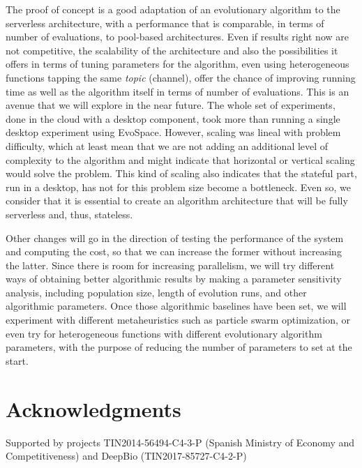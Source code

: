 \documentclass{llncs}
\begin{document}
  The proof of concept is a good adaptation of an evolutionary algorithm
  to the serverless architecture, with a performance that is comparable,
  in terms of number of evaluations, to pool-based architectures. Even
  if results right now are not competitive, the scalability of the
  architecture and also the possibilities it offers in terms of tuning
  parameters for the algorithm, even using heterogeneous functions
  tapping the same {\em topic} (channel), offer the chance of improving
  running time as well as the algorithm itself in terms of number of
  evaluations. This is an avenue that we will explore in the near
  future. The whole set of experiments, done in the cloud with a desktop
  component, took more than running a single desktop experiment using
  EvoSpace. However, scaling was lineal with problem difficulty, which
  at least mean that we are not adding an additional level of complexity
  to the algorithm and might indicate that horizontal or vertical
  scaling would solve the problem. This kind of scaling also indicates
  that the stateful part, run in a desktop, has not for this problem
  size become a bottleneck. Even so, we consider that it is essential to
  create an algorithm architecture that will be fully serverless and,
  thus, stateless.

  Other changes will go in the direction of testing the performance of
  the system and computing the cost, so that we can increase the former
  without increasing the latter. Since there is room for increasing
  parallelism, we will try different ways of obtaining better
  algorithmic results by making a parameter sensitivity analysis,
  including population size, length of evolution runs, and other
  algorithmic parameters.  Once those algorithmic baselines have been set, we will experiment
  with different metaheuristics such as particle swarm optimization, or
  even try for heterogeneous functions with different evolutionary
  algorithm parameters, with the purpose of reducing the number of
  parameters to set at the start.

\section*{Acknowledgments}

 Supported by
projects TIN2014-56494-C4-3-P (Spanish Ministry of Economy and
Competitiveness) and DeepBio (TIN2017-85727-C4-2-P)

  
  

  
\end{document}
